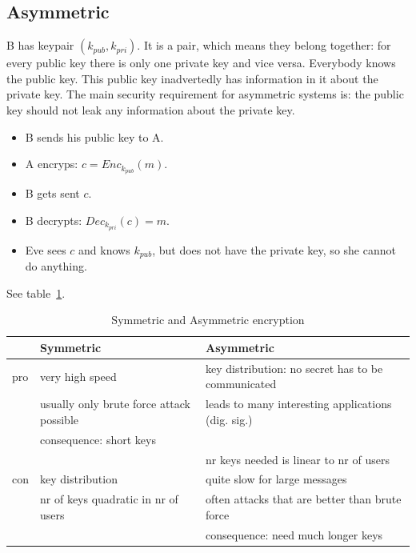 \documentclass[language=english,number=]{homework}
\begin{document}
    \subsection{Asymmetric}

    B has keypair $(k_{pub}, k_{pri})$.
    It is a pair, which means they belong together: for every public key there is only one private key and vice versa.
    Everybody knows the public key.
    This public key inadvertedly has information in it about  the private key.
    The main security requirement for asymmetric systems is: the public key should not leak any information about the private key.

    \begin{itemize}
        \item B sends his public key to A.
        \item A encryps: $c = Enc_{k_{pub}}(m)$.
        \item B gets sent $c$.
        \item B decrypts: $Dec_{k_{pri}}(c) = m$.
        \item Eve sees $c$ and knows $k_{pub}$, but does not have the private key, so she cannot do anything.
    \end{itemize}

    See table~\ref{tbl:symAsym}.

    \begin{table}[h]
        \centering
        \begin{tabular}{l|l|l}
            & Symmetric & Asymmetric \\ \hline
            pro & very high speed & key distribution: no secret has to be communicated \\
            & usually only brute force attack possible & leads to many interesting applications (dig. sig.) \\
            & consequence: short keys & \\
            & & nr keys needed is linear to nr of users \\ \hline
            con & key distribution & quite slow for large messages \\
            & nr of keys quadratic in nr of users & often attacks that are better than brute force \\
            & & consequence: need much longer keys \\
        \end{tabular}
        \caption{Symmetric and Asymmetric encryption}
        \label{tbl:symAsym}
    \end{table}
\end{document}
